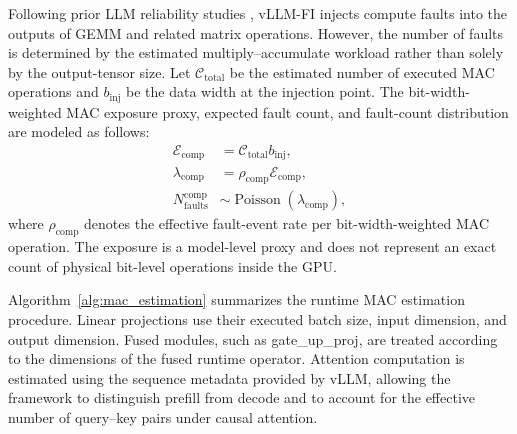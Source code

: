 Following prior LLM reliability studies \cite{sun2025demystifying,sun2025ft2,xie2025realm}, vLLM-FI injects compute faults into the outputs of GEMM and related matrix operations. However, the number of faults is determined by the estimated multiply--accumulate workload rather than solely by the output-tensor size. Let $\mathcal{C}_{\mathrm{total}}$ be the estimated number of executed MAC operations and $b_{\mathrm{inj}}$ be the data width at the injection point. The bit-width-weighted MAC exposure proxy, expected fault count, and fault-count distribution are modeled as follows:
\begin{align}
    \mathcal{E}_{\mathrm{comp}}
    &= \mathcal{C}_{\mathrm{total}}b_{\mathrm{inj}},
    \label{eq:compute_exposure}\\
    \lambda_{\mathrm{comp}}
    &= \rho_{\mathrm{comp}}\mathcal{E}_{\mathrm{comp}},
    \label{eq:compute_lambda}\\
    N_{\mathrm{faults}}^{\mathrm{comp}}
    &\sim \operatorname{Poisson}(\lambda_{\mathrm{comp}}),
    \label{eq:compute_poisson}
\end{align}
where $\rho_{\mathrm{comp}}$ denotes the effective fault-event rate per bit-width-weighted MAC operation. The exposure is a model-level proxy and does not represent an exact count of physical bit-level operations inside the GPU.

Algorithm~\ref{alg:mac_estimation} summarizes the runtime MAC estimation procedure. Linear projections use their executed batch size, input dimension, and output dimension. Fused modules, such as gate\_up\_proj, are treated according to the dimensions of the fused runtime operator. Attention computation is estimated using the sequence metadata provided by vLLM, allowing the framework to distinguish prefill from decode and to account for the effective number of query--key pairs under causal attention. 

